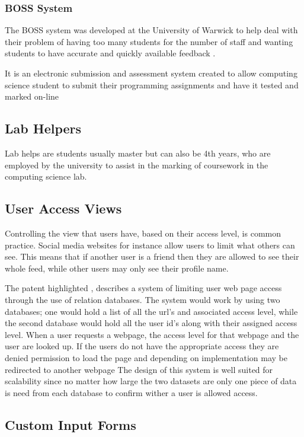 \documentclass[12pt]{article}  %
\begin{document}
\subsubsection{BOSS System}
The BOSS system  was developed at the University of Warwick to help deal with their problem of having too many students for the number of staff and wanting students to have accurate and quickly available feedback \cite{joy_boss_2005}. 
 
It is an electronic submission and assessment system created to allow computing science student to submit their programming assignments and have it tested and marked on-line \cite{joy_effective_1998}    

\subsection{Lab Helpers}
Lab helps are students usually master but can also be 4th years, who are employed by the university to assist in the marking of coursework in the computing science lab.   


\subsection{User Access Views}

Controlling the view that users have, based on their access level, is common practice. Social media websites for instance allow users to limit what others  can see. This means that if another user is a friend then they are allowed to see their whole feed, while other users may only see their profile name.

The patent highlighted \cite{baker_system_1997}, describes a system of limiting user web page access through the use of relation databases. The system would work by using two databases; one would hold a list of all the url's and associated access level, while the second database would hold all the user id's along with their assigned access level. When a user requests a webpage, the access level for that webpage and the user are looked up. If the users do not have the appropriate access they are denied permission to load the page and depending on implementation may be redirected to another webpage
The design of this system is well suited for scalability since no matter how large the two datasets are only one piece of data is need from each database to confirm wither a user is allowed access.


\subsection{Custom Input Forms}
\end{document}
